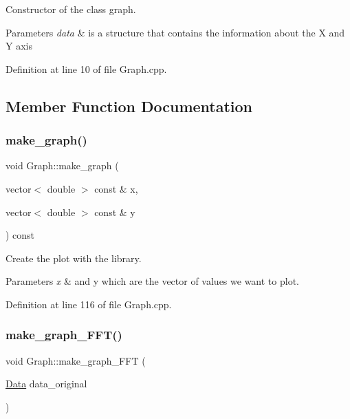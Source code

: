 Constructor of the class graph. 


\begin{DoxyParams}{Parameters}
{\em data} & is a structure that contains the information about the X and Y axis \\
\hline
\end{DoxyParams}


Definition at line 10 of file Graph.\+cpp.



\subsection{Member Function Documentation}
\mbox{\label{class_graph_ac179fa82679466194ea2a396d4382904}} 
\subsubsection{\texorpdfstring{make\+\_\+graph()}{make\_graph()}}
{\footnotesize\ttfamily void Graph\+::make\+\_\+graph (\begin{DoxyParamCaption}\item[{vector$<$ double $>$ const \&}]{x,  }\item[{vector$<$ double $>$ const \&}]{y }\end{DoxyParamCaption}) const}



Create the plot with the library. 


\begin{DoxyParams}{Parameters}
{\em x} & and y which are the vector of values we want to plot. \\
\hline
\end{DoxyParams}


Definition at line 116 of file Graph.\+cpp.

\mbox{\label{class_graph_a5326be30b090c2ba956d0e0211895fcd}} 
\subsubsection{\texorpdfstring{make\+\_\+graph\+\_\+\+F\+F\+T()}{make\_graph\_FFT()}}
{\footnotesize\ttfamily void Graph\+::make\+\_\+graph\+\_\+\+F\+FT (\begin{DoxyParamCaption}\item[{\mbox{\hyperlink{struct_data}{Data}}}]{data\+\_\+original }\end{DoxyParamCaption})}



